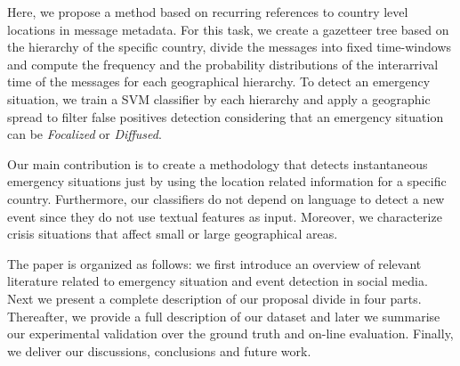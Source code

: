 \documentclass{llncs}
\begin{document}


Here, we propose a method based on recurring references to country level locations in message metadata. For this task, we create a gazetteer tree based on the hierarchy of the specific country, divide the messages into fixed time-windows and compute the frequency and the probability distributions of the interarrival time of the messages for each geographical hierarchy. To detect an emergency situation, we train a SVM classifier by each hierarchy and apply a geographic spread to filter false positives detection considering that an emergency situation can be \textit{Focalized} or \textit{Diffused}.  

Our main contribution is to create a methodology that detects instantaneous emergency situations just by using the location related information for a specific country. Furthermore, our classifiers do not depend on language to detect a new event since they do not use textual features as input. Moreover, we characterize crisis situations that affect small or large geographical areas.

The paper is organized as follows: we first introduce an overview of relevant literature related to emergency situation and event detection in social media. Next we present a complete description of our proposal divide in four parts. Thereafter, we provide a full description of our dataset and later we summarise our experimental validation over the ground truth and on-line evaluation. Finally, we deliver our discussions, conclusions and future work.
\end{document}
